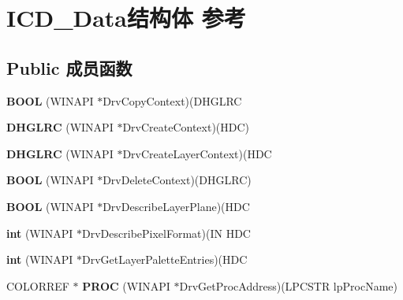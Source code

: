 \hypertarget{struct_i_c_d___data}{}\section{I\+C\+D\+\_\+\+Data结构体 参考}
\label{struct_i_c_d___data}
\subsection*{Public 成员函数}
\begin{DoxyCompactItemize}
\item 
\mbox{\label{struct_i_c_d___data_ab0997fa459ddd23e7797c9cbff6a01d3}} 
{\bfseries B\+O\+OL} (W\+I\+N\+A\+PI $\ast$Drv\+Copy\+Context)(D\+H\+G\+L\+RC
\item 
\mbox{\label{struct_i_c_d___data_a4b68490da61961a1dac13afa030285a4}} 
{\bfseries D\+H\+G\+L\+RC} (W\+I\+N\+A\+PI $\ast$Drv\+Create\+Context)(H\+DC)
\item 
\mbox{\label{struct_i_c_d___data_ae9c0faafc0821efdfe915f5735b10909}} 
{\bfseries D\+H\+G\+L\+RC} (W\+I\+N\+A\+PI $\ast$Drv\+Create\+Layer\+Context)(H\+DC
\item 
\mbox{\label{struct_i_c_d___data_aea24c3715dca08b3944514800cedafdc}} 
{\bfseries B\+O\+OL} (W\+I\+N\+A\+PI $\ast$Drv\+Delete\+Context)(D\+H\+G\+L\+RC)
\item 
\mbox{\label{struct_i_c_d___data_ab8623dc26050d5c66bbe9d5d14a55af7}} 
{\bfseries B\+O\+OL} (W\+I\+N\+A\+PI $\ast$Drv\+Describe\+Layer\+Plane)(H\+DC
\item 
\mbox{\label{struct_i_c_d___data_ac721309a6256f5606faa46dca42758b8}} 
{\bfseries int} (W\+I\+N\+A\+PI $\ast$Drv\+Describe\+Pixel\+Format)(IN H\+DC
\item 
\mbox{\label{struct_i_c_d___data_a691535a9f46e13c0c9905cb3764f5e50}} 
{\bfseries int} (W\+I\+N\+A\+PI $\ast$Drv\+Get\+Layer\+Palette\+Entries)(H\+DC
\item 
\mbox{\label{struct_i_c_d___data_a0321765a044cc7f91d5331ef8fe0e97a}} 
C\+O\+L\+O\+R\+R\+EF $\ast$ {\bfseries P\+R\+OC} (W\+I\+N\+A\+PI $\ast$Drv\+Get\+Proc\+Address)(L\+P\+C\+S\+TR lp\+Proc\+Name)

\end{DoxyCompactItemize}
